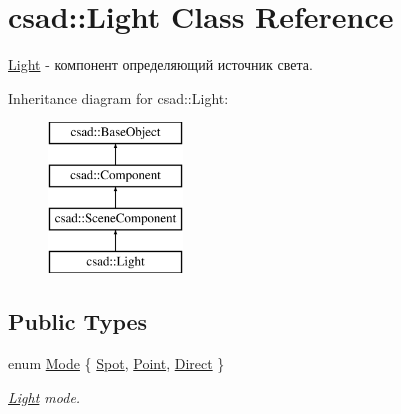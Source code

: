 \hypertarget{classcsad_1_1_light}{\section{csad\-:\-:Light Class Reference}
\label{classcsad_1_1_light}
}


\hyperlink{classcsad_1_1_light}{Light} -\/ компонент определяющий источник света.  


Inheritance diagram for csad\-:\-:Light\-:\begin{figure}[H]
\begin{center}
\leavevmode
\includegraphics[height=4.000000cm]{classcsad_1_1_light}
\end{center}
\end{figure}
\subsection*{Public Types}
\begin{DoxyCompactItemize}
\item 
enum \hyperlink{classcsad_1_1_light_a00ff745cbb2a56fa7920b53acc068bf9}{Mode} \{ \hyperlink{classcsad_1_1_light_a00ff745cbb2a56fa7920b53acc068bf9a8869086b492b505de0a5ff65dfc79855}{Spot}, 
\hyperlink{classcsad_1_1_light_a00ff745cbb2a56fa7920b53acc068bf9a88b7d47bf52492997dd86c1b1db7e34d}{Point}, 
\hyperlink{classcsad_1_1_light_a00ff745cbb2a56fa7920b53acc068bf9a16c2d7e0e3d4f1609cb948b99d0ff72e}{Direct}
 \}
\begin{DoxyCompactList}\small\item\em \hyperlink{classcsad_1_1_light}{Light} mode. \end{DoxyCompactList}\end{DoxyCompactItemize}
